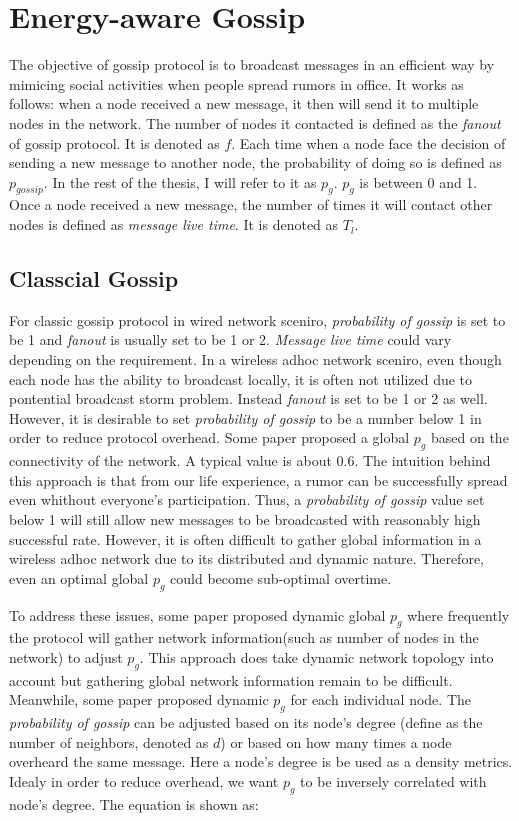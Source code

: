 \chapter{Energy-aware Gossip}

The objective of gossip protocol is to broadcast messages in an efficient way by mimicing social activities when people spread rumors in office. It works as follows: when a node received a new message, it then will send it to multiple nodes in the network. The number of nodes it contacted is defined as the \emph{fanout} of gossip protocol. It is denoted as $f$. Each time when a node face the decision of sending a new message to another node, the probability of doing so is defined as $p_{gossip}$. In the rest of the thesis, I will refer to it as $p_g$. $p_g$ is between 0 and 1. Once a node received a new message, the number of times it will contact other nodes is defined as \emph{message live time}. It is denoted as $T_l$.


\section{Classcial Gossip}
For classic gossip protocol in wired network sceniro, \emph{probability of gossip} is set to be 1 and \emph{fanout} is usually set to be 1 or 2. \emph{Message live time} could vary depending on the requirement. In a wireless adhoc network sceniro, even though each node has the ability to broadcast locally, it is often not utilized due to pontential broadcast storm problem. Instead \emph{fanout} is set to be 1 or 2 as well. However, it is desirable to set \emph{probability of gossip} to be a number below 1 in order to reduce protocol overhead. Some paper proposed a global $p_g$ based on the connectivity of the network. A typical value is about 0.6. The intuition behind this approach is that from our life experience, a rumor can be successfully spread even whithout everyone's participation. Thus, a \emph{probability of gossip} value set below 1 will still allow new messages to be broadcasted with reasonably high successful rate. However, it is often difficult to gather global information in a wireless adhoc network due to its distributed and dynamic nature. Therefore, even an optimal global $p_g$ could become sub-optimal overtime. 

To address these issues, some paper proposed dynamic global $p_g$ where frequently the protocol will gather network information(such as number of nodes in the network) to adjust $p_g$. This approach does take dynamic network topology into account but gathering global network information remain to be difficult. Meanwhile, some paper proposed dynamic $p_g$ for each individual node. The \emph{probability of gossip} can be adjusted based on its node's degree (define as the number of neighbors, denoted as $d$) or based on how many times a node overheard the same message. Here a node's degree is be used as a density metrics. Idealy in order to reduce overhead, we want $p_g$ to be inversely correlated with node's degree. The equation is shown as:

